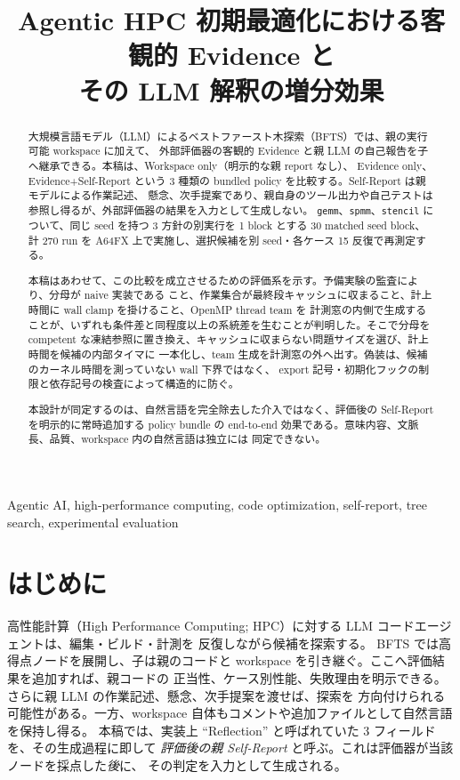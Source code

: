 \documentclass[conference,letterpaper]{IEEEtran}
\title{Agentic HPC 初期最適化における客観的 Evidence と\\
その LLM 解釈の増分効果}
\author{\IEEEauthorblockN{樹神宇徳}
\IEEEauthorblockA{名古屋大学大学院情報学研究科\\
愛知県名古屋市}}
\newcommand{\armW}{Workspace only}
\newcommand{\armE}{Evidence only}
\newcommand{\armS}{Evidence+Self-Report}
\begin{document}
\maketitle

\begin{abstract}
大規模言語モデル（LLM）によるベストファースト木探索（BFTS）では、親の実行可能 workspace に加えて、
外部評価器の客観的 Evidence と親 LLM の自己報告を子へ継承できる。本稿は、\armW（明示的な親 report なし）、
\armE、\armS{} という 3 種類の bundled policy を比較する。Self-Report は親モデルによる作業記述、
懸念、次手提案であり、親自身のツール出力や自己テストは参照し得るが、外部評価器の結果を入力として生成しない。
\texttt{gemm}、\texttt{spmm}、\texttt{stencil} について、同じ seed を持つ 3 方針の別実行を
1 block とする 30 matched seed block、計 270 run を A64FX 上で実施し、選択候補を別 seed・各ケース
15 反復で再測定する。

本稿はあわせて、この比較を成立させるための評価系を示す。予備実験の監査により、分母が naive 実装である
こと、作業集合が最終段キャッシュに収まること、計上時間に wall clamp を掛けること、OpenMP thread team を
計測窓の内側で生成することが、いずれも条件差と同程度以上の系統差を生むことが判明した。そこで分母を
competent な凍結参照に置き換え、キャッシュに収まらない問題サイズを選び、計上時間を候補の内部タイマに
一本化し、team 生成を計測窓の外へ出す。偽装は、候補のカーネル時間を測っていない wall 下界ではなく、
export 記号・初期化フックの制限と依存記号の検査によって構造的に防ぐ。

本設計が同定するのは、自然言語を完全除去した介入ではなく、評価後の Self-Report を明示的に常時追加する
policy bundle の end-to-end 効果である。意味内容、文脈長、品質、workspace 内の自然言語は独立には
同定できない。
\end{abstract}

\begin{IEEEkeywords}
Agentic AI, high-performance computing, code optimization, self-report,
tree search, experimental evaluation
\end{IEEEkeywords}

\section{はじめに}
高性能計算（High Performance Computing; HPC）に対する LLM コードエージェントは、編集・ビルド・計測を
反復しながら候補を探索する。
BFTS では高得点ノードを展開し、子は親のコードと workspace を引き継ぐ。ここへ評価結果を追加すれば、親コードの
正当性、ケース別性能、失敗理由を明示できる。さらに親 LLM の作業記述、懸念、次手提案を渡せば、探索を
方向付けられる可能性がある。一方、workspace 自体もコメントや追加ファイルとして自然言語を保持し得る。
本稿では、実装上 ``Reflection'' と呼ばれていた 3 フィールドを、その生成過程に即して
\emph{評価後の親 Self-Report} と呼ぶ。これは評価器が当該ノードを採点した\emph{後}に、
その判定を入力として生成される。
\end{document}

